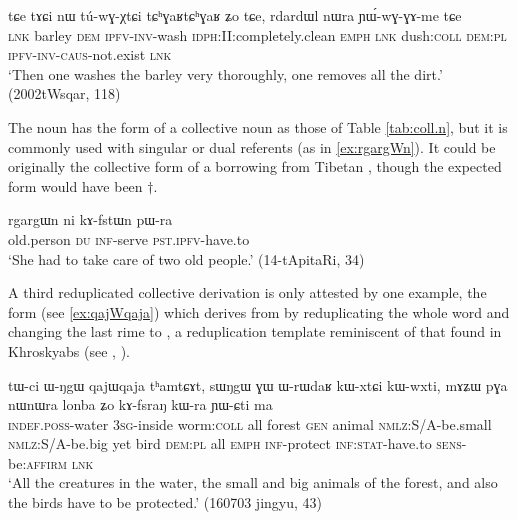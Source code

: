 \begin{exe}
\ex \label{ex:rdardWl}
\gll tɕe tɤɕi nɯ tú-wɣ-χtɕi tɕʰɣaʁtɕʰɣaʁ ʑo tɕe, rdardɯl nɯra ɲɯ́-wɣ-ɣɤ-me tɕe \\
\textsc{lnk} barley \textsc{dem} \textsc{ipfv}-\textsc{inv}-wash \textsc{idph}:II:completely.clean \textsc{emph} \textsc{lnk} dush:\textsc{coll} \textsc{dem:pl} \textsc{ipfv}-\textsc{inv}-\textsc{caus}-not.exist \textsc{lnk} \\
\glt `Then one washes the barley very thoroughly, one removes all the dirt.' (2002tWsqar, 118)
\end{exe}
 
The noun  has the form of a collective noun as those of Table \ref{tab:coll.n}, but it is commonly used with singular or dual referents (as in \ref{ex:rgargWn}). It could be originally the collective form of a borrowing from Tibetan , though the expected form would have been $\dagger$. 
 
\begin{exe}
\ex \label{ex:rgargWn}
\gll  rgargɯn ni kɤ-fstɯn pɯ-ra \\
old.person \textsc{du} \textsc{inf}-serve \textsc{pst.ipfv}-have.to \\
\glt `She had to take care of two old people.' (14-tApitaRi, 34)
\end{exe}

A third reduplicated collective derivation is only attested by one example, the form  (see \ref{ex:qajWqaja}) which derives from   by reduplicating the whole word and changing the last rime to , a reduplication template reminiscent of that found in Khroskyabs (see \citealt{lai13fuyin}, \citealt[22-24]{lai17khroskyabs}).

\begin{exe}
\ex \label{ex:qajWqaja}
\gll
tɯ-ci ɯ-ŋgɯ qajɯqaja tʰamtɕɤt, sɯŋgɯ ɣɯ ɯ-rɯdaʁ kɯ-xtɕi kɯ-wxti, mɤʑɯ pɣa nɯnɯra lonba ʑo kɤ-fsraŋ kɯ-ra ɲɯ-ɕti ma \\
\textsc{indef.poss}-water \textsc{3sg}-inside worm:\textsc{coll} all forest \textsc{gen} animal \textsc{nmlz}:S/A-be.small \textsc{nmlz}:S/A-be.big yet bird \textsc{dem:pl} all \textsc{emph} \textsc{inf}-protect \textsc{inf:stat}-have.to \textsc{sens}-be:\textsc{affirm} \textsc{lnk} \\
\glt `All the creatures in the water, the small and big animals of the forest, and also the birds have to be protected.' (160703 jingyu, 43)
\end{exe}


